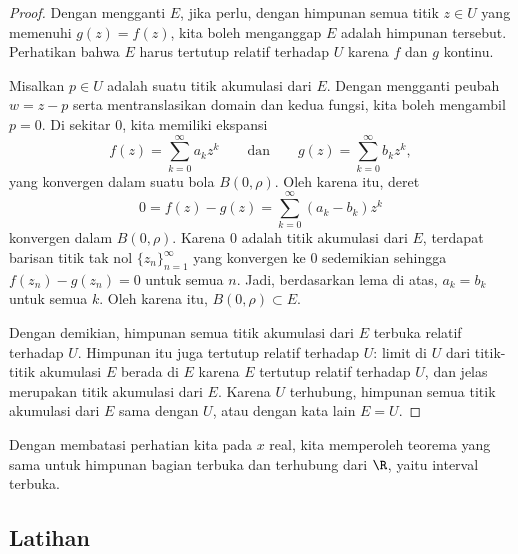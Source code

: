 \begin{proof}
Dengan mengganti $E$, jika perlu, dengan himpunan semua titik $z \in U$ yang
memenuhi $g(z)=f(z)$, kita boleh menganggap $E$ adalah himpunan tersebut.
Perhatikan bahwa $E$ harus tertutup relatif terhadap $U$ karena $f$ dan $g$
kontinu.

Misalkan $p \in U$ adalah suatu titik akumulasi dari $E$.  Dengan mengganti
peubah $w=z-p$ serta mentranslasikan domain dan kedua fungsi, kita boleh
mengambil $p=0$.  Di sekitar $0$, kita memiliki ekspansi
\begin{equation*}
f(z) = \sum_{k=0}^\infty a_k {z}^k 
\qquad
\text{dan}
\qquad
g(z) = \sum_{k=0}^\infty b_k {z}^k ,
\end{equation*}
yang konvergen dalam suatu bola $B(0,\rho)$.  Oleh karena itu, deret
\begin{equation*}
0 = f(z)-g(z) = 
\sum_{k=0}^\infty (a_k-b_k) z^k
\end{equation*}
konvergen dalam $B(0,\rho)$.  Karena $0$ adalah titik akumulasi dari $E$,
terdapat barisan titik tak nol $\{ z_n \}_{n=1}^\infty$ yang konvergen ke $0$
sedemikian sehingga $f(z_n) -g(z_n) = 0$ untuk semua $n$.  Jadi, berdasarkan lema di atas,
$a_k = b_k$ untuk semua $k$.  Oleh karena itu, $B(0,\rho) \subset E$.

Dengan demikian, himpunan semua titik akumulasi dari $E$ terbuka relatif
terhadap $U$.  Himpunan itu juga tertutup relatif terhadap $U$: limit di $U$
dari titik-titik akumulasi $E$ berada di $E$ karena $E$ tertutup relatif
terhadap $U$, dan jelas merupakan titik akumulasi dari $E$.
Karena $U$ terhubung, himpunan semua titik akumulasi dari $E$
sama dengan $U$, atau dengan kata lain $E = U$.
\end{proof}

Dengan membatasi perhatian kita pada $x$ real, kita memperoleh teorema yang sama
untuk himpunan bagian terbuka dan terhubung dari $\R$, yaitu interval terbuka.

\subsection{Latihan}

